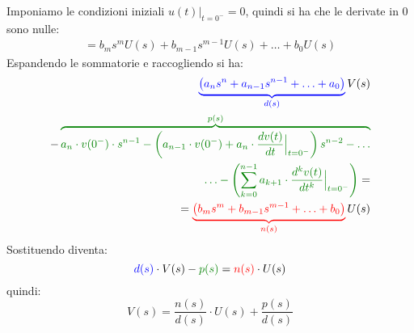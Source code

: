 \documentclass[a4paper]{article}
\begin{document}
Imponiamo le condizioni iniziali \( u(t) \Big|_{t=0^-} = 0 \), quindi si ha che le
derivate in 0 sono nulle:
\[
  \begin{aligned}
    = b_m s^{m} U(s) + b_{m-1} s^{m-1} U(s) + \ldots + b_0 U(s)
  \end{aligned}
\] 
Espandendo le sommatorie e raccogliendo si ha:
\[
\begin{aligned}
  \color{blue}\underbrace{\left( a_n s^n + a_{n-1} s^{n-1} + \ldots + a_0 \right)}_{d(s)}\color{black} V(s) \\
  - \color{green!50!black}\overbrace{a_n \cdot  v(0^-) \cdot  s^{n-1} - \left( a_{n-1} \cdot  v(0^-) + a_n \cdot  \frac{dv(t)}{dt} \Big|_{t=0^-} \right) s^{n-2} - \ldots}^{p(s)}\\
  \color{green!50!black}\ldots - \left( \sum_{k=0}^{n-1} a_{k+1} \cdot  \frac{d^{k} v(t)}{dt^{k}} \Big|_{t=0^-} \right) \color{black}=\\
  = \color{red}\underbrace{\left( b_m s^{m} + b_{m-1} s^{m-1} + \ldots + b_0 \right)}_{n(s)}\color{black} U(s)
\end{aligned}
\] 
Sostituendo diventa:
\[
  \color{blue}d(s)\color{black} \cdot V(s) - \color{green!50!black}p(s)\color{black} = \color{red}n(s)\color{black} \cdot U(s)
\] 
quindi:
\[
  V(s) = \frac{n(s)}{d(s)} \cdot U(s) + \frac{p(s)}{d(s)}
\] 
\end{document}
